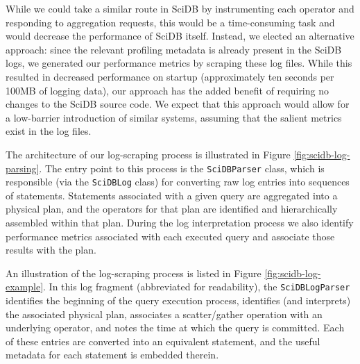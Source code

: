 \documentclass{chi2009}
\begin{document}
While we could take a similar route in SciDB by instrumenting each operator and responding to aggregation requests, this would be a time-consuming task and would decrease the performance of SciDB itself.  Instead, we elected an alternative approach: since the relevant profiling metadata is already present in the SciDB logs, we generated our performance metrics by scraping these log files.  While this resulted in decreased performance on startup (approximately ten seconds per 100MB of logging data), our approach has the added benefit of requiring no changes to the SciDB source code.  We expect that this approach would allow for a low-barrier introduction of similar systems, assuming that the salient metrics exist in the log files.

The architecture of our log-scraping process is illustrated in Figure \ref{fig:scidb-log-parsing}.  The entry point to this process is the \texttt{SciDBParser} class, which is responsible (via the \texttt{SciDBLog} class) for converting raw log entries into sequences of statements.  Statements associated with a given query are aggregated into a physical plan, and the operators for that plan are identified and hierarchically assembled within that plan.  During the log interpretation process we also identify performance metrics associated with each executed query and associate those results with the plan.

An illustration of the log-scraping process is listed in Figure \ref{fig:scidb-log-example}.  In this log fragment (abbreviated for readability), the \texttt{SciDBLogParser} identifies the beginning of the query execution process, identifies (and interprets) the associated physical plan, associates a scatter/gather operation with an underlying operator, and notes the time at which the query is committed.  Each of these entries are converted into an equivalent statement, and the useful metadata for each statement is embedded therein.
\end{document}
